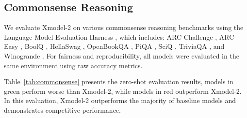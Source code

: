 \documentclass{article}
\newcommand{\llm}{Xmodel-2\xspace}
\begin{document}
\subsection{Commonsense Reasoning}
We evaluate \llm on various commonsense reasoning benchmarks using the Language Model Evaluation Harness \citep{eval-harness}, which includes: ARC-Challenge \citep{clark2018think}, ARC-Easy \citep{clark2018think}, BoolQ \citep{clark2019boolq}, HellaSwag \citep{zellers2019hellaswag}, OpenBookQA \citep{mihaylov2018suit}, PiQA \citep{Bisk2019PIQARA}, SciQ \citep{welbl2017crowdsourcing}, TriviaQA \citep{joshi2017triviaqa}, and Winogrande \citep{Sakaguchi2021WinoGrande}. For fairness and reproducibility, all models were evaluated in the same environment using raw accuracy metrics.

Table~\ref{tab:commonsense} presents the zero-shot evaluation results, models in green perform worse than \llm, while models in red outperform \llm. In this evaluation, \llm outperforms the majority of baseline models and demonstrates competitive performance.
\end{document}
